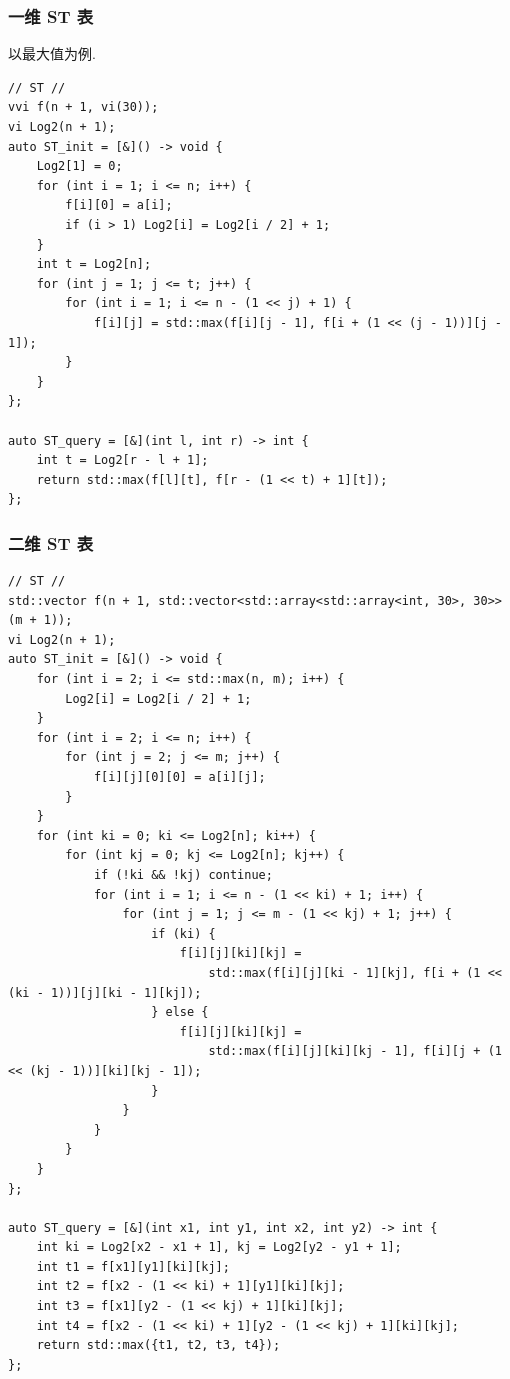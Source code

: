 \documentclass[UTF8, a4paper, titlepage, twoside]{ctexart}
\begin{document}
\subsubsection{ 一维 ST 表 }
以最大值为例. 
\begin{lstlisting}[style = cpp]
// ST //
vvi f(n + 1, vi(30));
vi Log2(n + 1);
auto ST_init = [&]() -> void {
    Log2[1] = 0;
    for (int i = 1; i <= n; i++) {
        f[i][0] = a[i];
        if (i > 1) Log2[i] = Log2[i / 2] + 1;
    }
    int t = Log2[n];
    for (int j = 1; j <= t; j++) {
        for (int i = 1; i <= n - (1 << j) + 1) {
            f[i][j] = std::max(f[i][j - 1], f[i + (1 << (j - 1))][j - 1]);
        }
    }
};

auto ST_query = [&](int l, int r) -> int {
    int t = Log2[r - l + 1];
    return std::max(f[l][t], f[r - (1 << t) + 1][t]);
};
\end{lstlisting}

\subsubsection{ 二维 ST 表 }
\begin{lstlisting}[style=cpp]
// ST //
std::vector f(n + 1, std::vector<std::array<std::array<int, 30>, 30>>(m + 1));
vi Log2(n + 1);
auto ST_init = [&]() -> void {
    for (int i = 2; i <= std::max(n, m); i++) {
        Log2[i] = Log2[i / 2] + 1;
    }
    for (int i = 2; i <= n; i++) {
        for (int j = 2; j <= m; j++) {
            f[i][j][0][0] = a[i][j];
        }
    }
    for (int ki = 0; ki <= Log2[n]; ki++) {
        for (int kj = 0; kj <= Log2[n]; kj++) {
            if (!ki && !kj) continue;
            for (int i = 1; i <= n - (1 << ki) + 1; i++) {
                for (int j = 1; j <= m - (1 << kj) + 1; j++) {
                    if (ki) {
                        f[i][j][ki][kj] =
                            std::max(f[i][j][ki - 1][kj], f[i + (1 << (ki - 1))][j][ki - 1][kj]);
                    } else {
                        f[i][j][ki][kj] =
                            std::max(f[i][j][ki][kj - 1], f[i][j + (1 << (kj - 1))][ki][kj - 1]);
                    }
                }
            }
        }
    }
};

auto ST_query = [&](int x1, int y1, int x2, int y2) -> int {
    int ki = Log2[x2 - x1 + 1], kj = Log2[y2 - y1 + 1];
    int t1 = f[x1][y1][ki][kj];
    int t2 = f[x2 - (1 << ki) + 1][y1][ki][kj];
    int t3 = f[x1][y2 - (1 << kj) + 1][ki][kj];
    int t4 = f[x2 - (1 << ki) + 1][y2 - (1 << kj) + 1][ki][kj];
    return std::max({t1, t2, t3, t4});
};
\end{lstlisting}
\end{document}
